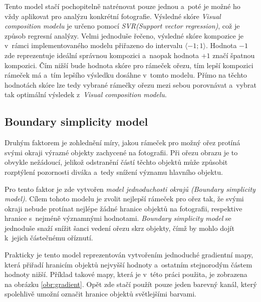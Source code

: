 Tento model stačí pochopitelně natrénovat pouze jednou a~poté je  možné ho vždy aplikovat pro analýzu konkrétní fotografie. Výsledné skóre \emph{Visual composition modelu} je určeno pomocí \emph{SVR(Support vector regression)}, což je způsob regresní analýzy. Velmi jednoduše řečeno, výsledné skóre kompozice je v~rámci implementovaného modelu přiřazeno do intervalu $\langle -1;1 \rangle$. Hodnota $-1$ zde reprezentuje ideální správnou kompozici a~naopak hodnota $+1$ značí špatnou kompozici. Čím nižší bude hodnota skóre pro rámeček ořezu, tím lepší kompozici rámeček má a~tím lepšího výsledku dosáhne v~tomto modelu. Přímo na těchto hodnotách skóre lze tedy vybrané rámečky ořezu mezi sebou porovnávat a~vybrat tak optimální výsledek z~\emph{Visual composition modelu}.


\subsection{Boundary simplicity model}
Druhým faktorem je zohlednění míry, jakou rámeček pro možný ořez protíná svými okraji výrazné objekty zachycené na fotografii. Při ořezu obrazu je to obvykle nežádoucí, jelikož odstranění částí těchto objektů může způsobit rozptýlení pozornosti diváka a~tedy snížení významu hlavního objektu.

Pro tento faktor je zde vytvořen \emph{model jednoduchosti okrajů (Boundary simplicity model)}. Cílem tohoto modelu je zvolit nejlepší rámeček pro ořez tak, že svými okraji nebude protínat nejlépe žádné hranice objektů na fotografii, respektive hranice s~nejméně významnými hodnotami. \emph{Boundary simplicity model} se jednoduše snaží snížit šanci vedení ořezu skrz objekty, čímž by mohlo dojít k~jejich částečnému oříznutí.

Prakticky je tento model reprezentován vytvořením jednoduché gradientní mapy, která přiřadí hranicím objektů nejvyšší hodnoty a~ostatním stejnorodým částem hodnoty nižší. Příklad takové mapy, která je v~této práci použita, je zobrazena na obrázku \ref{obr:gradient}. Opět zde stačí použít pouze jeden barevný kanál, který spolehlivě umožní označit hranice objektů světlejšími barvami.

